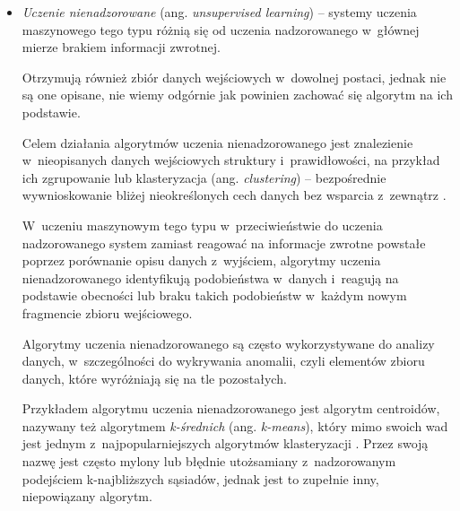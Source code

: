 {\begin{itemize}
        Systemu uczenia nadzorowanego nie potrafią jednak funkcjonować w~izolacji -- potrzebują \emph{nadzoru}, zewnętrznej pomocy w~postaci poprawnie opisanych lub skategoryzowanych danych wejściowych.
        W~praktyce oznacza to, że uczenie nadzorowane jest zależne od człowieka, który musi dostarczyć algorytmowi dane wejściowe wraz z~opisami, które często z~angielskiego nazywane są \emph{labels}.
        Mimo skuteczności są więc ograniczane przez ilość danych, jaką jesteśmy w~stanie dostarczyć, a~także przez to, jak dobrze są one opisane.

        Popularnymi przykładami algorytmów uczenia nadzorowanego są między innymi \emph{regresja logistyczna} oraz \emph{k-najbliższych sąsiadów}.


  \item \emph{Uczenie nienadzorowane} (ang. \emph{unsupervised learning}) --
        systemy uczenia maszynowego tego typu różnią się od uczenia nadzorowanego w~głównej mierze brakiem informacji zwrotnej.

        Otrzymują również zbiór danych wejściowych w~dowolnej postaci, jednak nie są one opisane, nie wiemy odgórnie jak powinien zachować się algorytm na ich podstawie.

        Celem działania algorytmów uczenia nienadzorowanego jest znalezienie w~nieopisanych danych wejściowych struktury i~prawidłowości, na przykład ich zgrupowanie lub klasteryzacja (ang. \emph{clustering}) -- bezpośrednie wywnioskowanie bliżej nieokreślonych cech danych bez wsparcia z~zewnątrz \cite{hastie2009unsupervised}.

        W~uczeniu maszynowym tego typu w~przeciwieństwie do uczenia nadzorowanego system zamiast reagować na informacje zwrotne powstałe poprzez porównanie opisu danych z~wyjściem, algorytmy uczenia nienadzorowanego identyfikują podobieństwa w~danych i~reagują na podstawie obecności lub braku takich podobieństw w~każdym nowym fragmencie zbioru wejściowego.

        Algorytmy uczenia nienadzorowanego są często wykorzystywane do analizy danych, w~szczególności do wykrywania anomalii, czyli elementów zbioru danych, które wyróżniają się na tle pozostałych.

        Przykładem algorytmu uczenia nienadzorowanego jest algorytm centroidów, nazywany też algorytmem \emph{k-średnich} (ang. \emph{k-means}), który mimo swoich wad jest jednym z~najpopularniejszych algorytmów klasteryzacji \cite{ahmed2020k}.
        Przez swoją nazwę jest często mylony lub błędnie utożsamiany z~nadzorowanym podejściem k-najbliższych sąsiadów, jednak jest to zupełnie inny, niepowiązany algorytm.


\end{itemize}}

